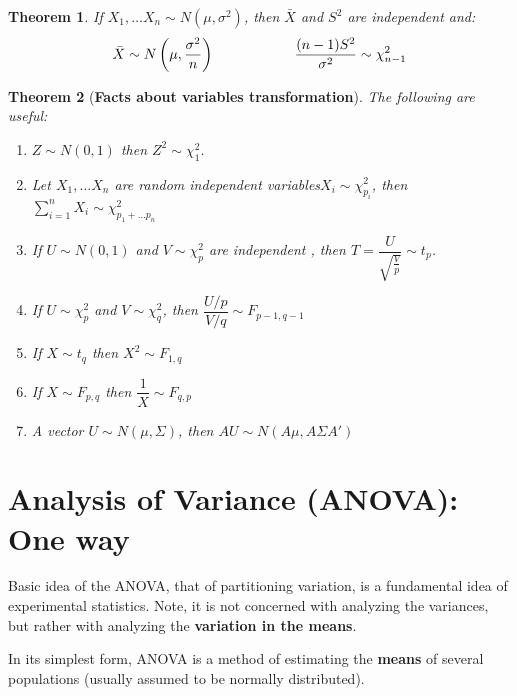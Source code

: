 \documentclass[11pt]{article}
\newtheorem{thm}{Theorem}[subsection]
\begin{document}
\begin{thm}
	If  $X_1, \dots X_n \sim N(\mu, \sigma^2)$, then $\bar{X}$ and $S^2$ are independent and: 
	$$\bar{X} \sim N\left(\mu, \dfrac{\sigma^2}{n}\right) \hspace{2.0 cm } \dfrac{(n - 1)S^2}{\sigma^2} \sim \chi^2_{n - 1} $$ 
\end{thm}
\begin{thm}[\textbf{Facts about variables transformation}]  \label{thm: properties}The following are useful:
	\begin{enumerate}
		\item $Z \sim N(0, 1)$ then $Z^2 \sim \chi_1^2$.
		\item  Let $X_1, \dots X_n$ are random independent variables$X_i \sim \chi^2_{p_i}$, then $\sum_{i = 1}^n X_i \sim \chi^2_{p_1 +\dots p_n}$
		\item If $U \sim N(0, 1)$ and $V \sim \chi^2_p$ are independent , then $T = \dfrac{U}{\sqrt{\frac{V}{p}}} \sim t_p$.
		\item If $U \sim \chi^2_p$ and $V \sim \chi^2_q$, then  $\dfrac{U/p}{V/q} \sim F_{p -1, q - 1}$
		\item If $X \sim t_q$ then $X^2 \sim F_{1, q}$
		\item If $X \sim F_{p, q}$ then $\dfrac{1}{X} \sim F_{q, p}$
		\item A vector $U \sim N(\mu, \Sigma)$, then $AU \sim N(A \mu, A \Sigma A')$
	\end{enumerate}
	
\end{thm}
	\section{Analysis of Variance (ANOVA): One way  }
	 Basic idea of the ANOVA, that of partitioning variation, is a fundamental idea of experimental statistics. Note, it is not concerned with analyzing the variances, but rather with analyzing the \textbf{variation in the means}.
	 
	 In its simplest form, ANOVA is a method of estimating the \textbf{means} of several populations (usually assumed to be normally distributed). 
	 
\end{document}
